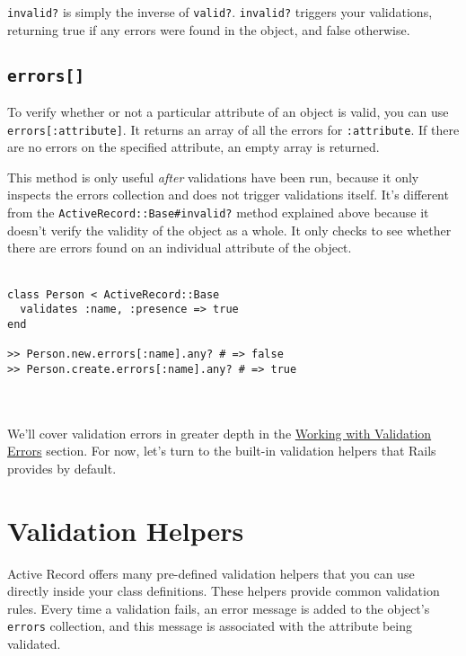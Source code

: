 \documentclass[10pt]{book}
\begin{document}
\texttt{invalid?} is simply the inverse of \texttt{valid?}. \texttt{invalid?} triggers your validations, returning true if any errors were found in the object, and false otherwise.

\subsection{ \texttt{errors[]}}

To verify whether or not a particular attribute of an object is valid, you can use \texttt{errors[:attribute]}. It returns an array of all the errors for \texttt{:attribute}. If there are no errors on the specified attribute, an empty array is returned.

This method is only useful \emph{after} validations have been run,  because it only inspects the errors collection and does not trigger  validations itself. It’s different from the \texttt{ActiveRecord::Base\#invalid?}  method explained above because it doesn’t verify the validity of the  object as a whole. It only checks to see whether there are errors found  on an individual attribute of the object.
\\ \\
\begin{minipage}{\textwidth}{\scriptsize
\begin{verbatim}
class Person < ActiveRecord::Base
  validates :name, :presence => true
end
 
>> Person.new.errors[:name].any? # => false
>> Person.create.errors[:name].any? # => true
\end{verbatim}}
\end{minipage}
\\ \\

We’ll cover validation errors in greater depth in the \hyperlink{working-with-validation-errors}{Working with Validation Errors} section. For now, let’s turn to the built-in validation helpers that Rails provides by default.

\section{ Validation Helpers}

Active Record offers many pre-defined validation helpers that you can  use directly inside your class definitions. These helpers provide  common validation rules. Every time a validation fails, an error message  is added to the object’s \texttt{errors} collection, and this message is associated with the attribute being validated.
\end{document}
